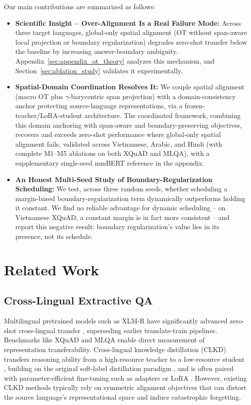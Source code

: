\documentclass[11pt]{article}
\begin{document}
Our main contributions are summarized as follows:
\begin{itemize}
    \item \textbf{Scientific Insight -- Over-Alignment Is a Real Failure Mode:} Across three target languages, global-only spatial alignment (OT without span-aware local projection or boundary regularization) degrades zero-shot transfer below the baseline by increasing answer-boundary ambiguity. Appendix~\ref{sec:appendix_ot_theory} analyzes this mechanism, and Section~\ref{sec:ablation_study} validates it experimentally.
    \item \textbf{Spatial-Domain Coordination Resolves It:} We couple spatial alignment (macro OT plus $\gamma$-barycentric span projection) with a domain-consistency anchor protecting source-language representations, via a frozen-teacher/LoRA-student architecture. The coordinated framework, combining this domain anchoring with span-aware and boundary-preserving objectives, recovers and exceeds zero-shot performance where global-only spatial alignment fails, validated across Vietnamese, Arabic, and Hindi (with complete M1--M5 ablations on both XQuAD and MLQA), with a supplementary single-seed mmBERT reference \citep{marone2026mmbert} in the appendix.
    \item \textbf{An Honest Multi-Seed Study of Boundary-Regularization Scheduling:} We test, across three random seeds, whether scheduling a margin-based boundary-regularization term dynamically outperforms holding it constant. We find no reliable advantage for dynamic scheduling -- on Vietnamese XQuAD, a constant margin is in fact more consistent -- and report this negative result: boundary regularization's value lies in its presence, not its schedule.
\end{itemize}

\section{Related Work}

\subsection{Cross-Lingual Extractive QA}
Multilingual pretrained models such as XLM-R have significantly advanced zero-shot cross-lingual transfer \citep{conneau-etal-2020-unsupervised}, superseding earlier translate-train pipelines. Benchmarks like XQuAD and MLQA \citep{artetxe-etal-2020-cross, lewis-etal-2020-mlqa} enable direct measurement of representation transferability. Cross-lingual knowledge distillation (CLKD) transfers reasoning ability from a high-resource teacher to a low-resource student \citep{gupta-etal-2023-cross}, building on the original soft-label distillation paradigm \citep{hinton2015distillingknowledgeneuralnetwork}, and is often paired with parameter-efficient fine-tuning such as adapters \citep{pfeiffer-etal-2020-mad} or LoRA \citep{hu2022lora}. However, existing CLKD methods typically rely on symmetric alignment objectives that can distort the source language’s representational space and induce catastrophic forgetting.
\end{document}

